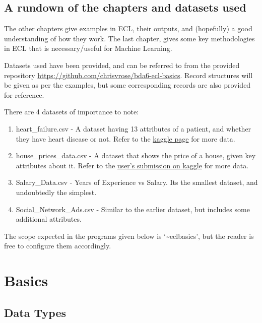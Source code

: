 \documentclass[a4paper,oneside,12pt]{book}
\begin{document}
\section[Chapter information and Datasets]{A rundown of the chapters and datasets used}

The other chapters give examples in ECL, their outputs, and (hopefully) a good understanding of how they work. The last chapter, gives some key methodologies in ECL that is necessary/useful for Machine Learning.

Datasets used have been provided, and can be referred to from the provided repository \url{https://github.com/chrisvrose/bda6-ecl-basics}. Record structures will be given as per the examples, but some corresponding records are also provided for reference.

There are 4 datasets of importance to note:
\begin{enumerate}
    \item heart\_failure.csv - A dataset having 13 attributes of a patient, and whether they have heart disease or not. Refer to the \href{https://www.kaggle.com/ronitf/heart-disease-uci}{kaggle page} for more data. 
    \item house\_prices\_data.csv - A dataset that shows the price of a house, given key attributes about it. Refer to the \href{https://www.kaggle.com/shivachandel/kc-house-data}{user's submission on kaggle} for more data.
    \item Salary\_Data.csv - Years of Experience vs Salary. Its the smallest dataset, and undoubtedly the simplest.
    \item Social\_Network\_Ads.csv - Similar to the earlier dataset, but includes some additional attributes.
\end{enumerate}

The scope expected in the programs given below is `\~{}eclbasics', but the reader is free to configure them accordingly.

\chapter{Basics}

\section{Data Types}
\end{document}
